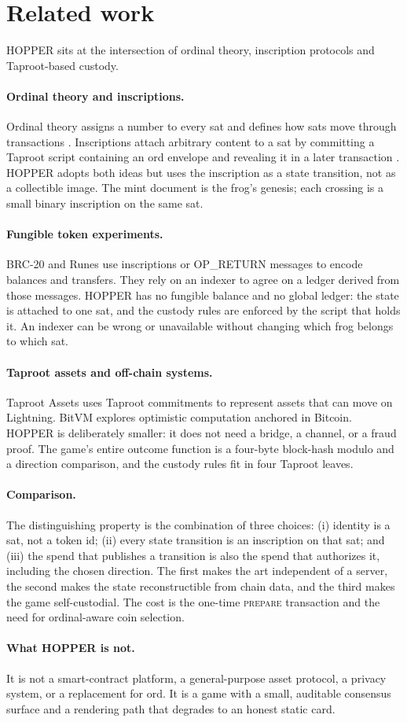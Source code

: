 \section{Related work}\label{sec:related}

HOPPER sits at the intersection of ordinal theory, inscription protocols and
Taproot-based custody.

\paragraph{Ordinal theory and inscriptions.}
Ordinal theory assigns a number to every sat and defines how sats move
through transactions \cite{ordinals,ord}. Inscriptions attach arbitrary
content to a sat by committing a Taproot script containing an ord envelope
and revealing it in a later transaction \cite{ord}. HOPPER adopts both ideas
but uses the inscription as a state transition, not as a collectible image.
The mint document is the frog's genesis; each crossing is a small binary
inscription on the same sat.

\paragraph{Fungible token experiments.}
BRC-20 \cite{brc20} and Runes \cite{runes} use inscriptions or OP\_RETURN
messages to encode balances and transfers. They rely on an indexer to agree
on a ledger derived from those messages. HOPPER has no fungible balance and
no global ledger: the state is attached to one sat, and the custody rules are
enforced by the script that holds it. An indexer can be wrong or unavailable
without changing which frog belongs to which sat.

\paragraph{Taproot assets and off-chain systems.}
Taproot Assets \cite{taprootassets} uses Taproot commitments to represent
assets that can move on Lightning. BitVM \cite{bitvm} explores optimistic
computation anchored in Bitcoin. HOPPER is deliberately smaller: it does not
need a bridge, a channel, or a fraud proof. The game's entire outcome
function is a four-byte block-hash modulo and a direction comparison, and the
custody rules fit in four Taproot leaves.

\paragraph{Comparison.}
The distinguishing property is the combination of three choices:
(i) identity is a sat, not a token id; (ii) every state transition is an
inscription on that sat; and (iii) the spend that publishes a transition is
also the spend that authorizes it, including the chosen direction. The first
makes the art independent of a server, the second makes the state
reconstructible from chain data, and the third makes the game self-custodial.
The cost is the one-time \textsc{prepare} transaction and the need for
ordinal-aware coin selection.

\paragraph{What HOPPER is not.}
It is not a smart-contract platform, a general-purpose asset protocol, a
privacy system, or a replacement for ord. It is a game with a small,
auditable consensus surface and a rendering path that degrades to an honest
static card.
